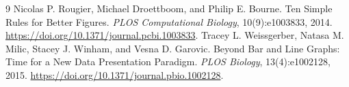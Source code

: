\begin{thebibliography}{9}
Nicolas P. Rougier, Michael Droettboom, and Philip E. Bourne.
Ten Simple Rules for Better Figures.
\emph{PLOS Computational Biology}, 10(9):e1003833, 2014.
\url{https://doi.org/10.1371/journal.pcbi.1003833}.
Tracey L. Weissgerber, Natasa M. Milic, Stacey J. Winham, and Vesna D. Garovic.
Beyond Bar and Line Graphs: Time for a New Data Presentation Paradigm.
\emph{PLOS Biology}, 13(4):e1002128, 2015.
\url{https://doi.org/10.1371/journal.pbio.1002128}.
\end{thebibliography}
